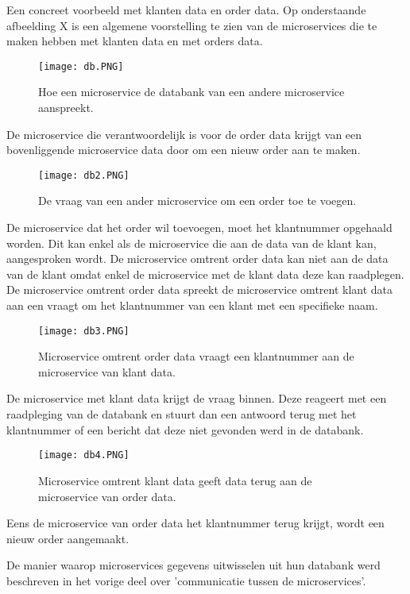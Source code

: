 Een concreet voorbeeld met klanten data en order data. Op onderstaande afbeelding X is een algemene voorstelling te zien van de microservices die te maken hebben met klanten data en met orders data. 
\begin{figure}[h!]
	\texttt{[image: db.PNG]}
	\centering
	\caption{Hoe een microservice de databank van een andere microservice aanspreekt.}
\end{figure}

De microservice die verantwoordelijk is voor de order data krijgt van een bovenliggende microservice data door om een nieuw order aan te maken. 

\begin{figure}[h!]
	\texttt{[image: db2.PNG]}
	\centering
	\caption{De vraag van een ander microservice om een order toe te voegen.}
\end{figure}

De microservice dat het order wil toevoegen, moet het klantnummer opgehaald worden. Dit kan enkel als de microservice die aan de data van de klant kan, aangesproken wordt. De microservice omtrent order data kan niet aan de data van de klant omdat enkel de microservice met de klant data deze kan raadplegen. De microservice omtrent order data spreekt de microservice omtrent klant data aan een vraagt om het klantnummer van een klant met een specifieke naam.

\begin{figure}[h!]
	\texttt{[image: db3.PNG]}
	\centering
	\caption{Microservice omtrent order data vraagt een klantnummer aan de microservice van klant data.}
\end{figure}

De microservice met klant data krijgt de vraag binnen. Deze reageert met een raadpleging van de databank en stuurt dan een antwoord terug met het klantnummer of een bericht dat deze niet gevonden werd in de databank. 
\begin{figure}[h!]
	\texttt{[image: db4.PNG]}
	\centering
	\caption{Microservice omtrent klant data geeft data terug aan de microservice van order data.}
\end{figure}

Eens de microservice van order data het klantnummer terug krijgt, wordt een nieuw order aangemaakt.
 
De manier waarop microservices gegevens uitwisselen uit hun databank werd beschreven in het vorige deel over 'communicatie tussen de microservices'.
 
